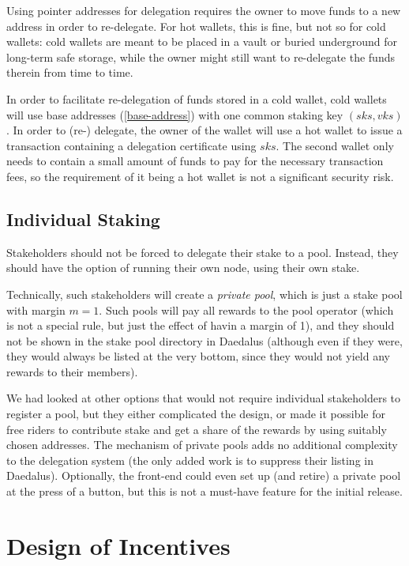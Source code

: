 \documentclass[11pt,a4paper]{article}
\begin{document}
Using pointer addresses for delegation requires the owner to move funds
to a new address in order to re-delegate. For hot wallets, this is fine,
but not so for cold wallets: cold wallets are meant to be placed in a
vault or buried underground for long-term safe storage, while the owner
might still want to re-delegate the funds therein from time to time.

In order to facilitate re-delegation of funds stored in a cold wallet,
cold wallets will use base addresses (\cref{base-address}) with one
common staking key \((sks, vks)\). In order to (re-) delegate, the owner
of the wallet will use a hot wallet to issue a transaction containing a
delegation certificate using \(sks\). The second wallet only needs to
contain a small amount of funds to pay for the necessary transaction
fees, so the requirement of it being a hot wallet is not a significant
security risk.

\subsection{Individual Staking}
\label{individual-staking}

Stakeholders should not be forced to delegate their stake to a
pool. Instead, they should have the option of running their own node,
using their own stake.

Technically, such stakeholders will create a \emph{private pool},
which is just a stake pool with margin \(m=1\). Such pools will
pay all rewards to the pool operator (which is not a special rule, but
just the effect of havin a margin of 1), and they should not be shown
in the stake pool directory in Daedalus (although even if they were,
they would always be listed at the very bottom, since they would not
yield any rewards to their members).

We had looked at other options that would not require individual
stakeholders to register a pool, but they either complicated the
design, or made it possible for free riders to contribute stake and
get a share of the rewards by using suitably chosen addresses. The
mechanism of private pools adds no additional complexity to the
delegation system (the only added work is to suppress their listing in
Daedalus). Optionally, the front-end could even set up (and retire) a
private pool at the press of a button, but this is not a must-have
feature for the initial release.

\section{Design of Incentives}
\label{design-of-incentives}
\end{document}
